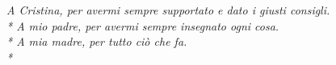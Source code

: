 \begin{flushright}
\itshape{ A Cristina, per avermi sempre supportato e dato i giusti consigli.} \\*
\itshape{ A mio padre, per avermi sempre insegnato ogni cosa.} \\*
\itshape{ A mia madre, per tutto ci\`o che fa.} \\*
\end{flushright}
